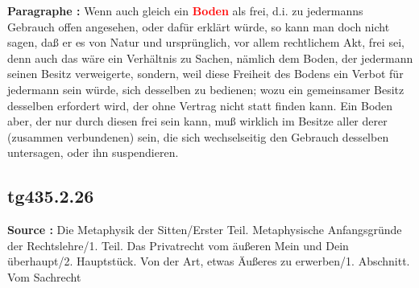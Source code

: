 \documentclass[a4paper,12pt,twoside]{book}
\newcommand{\match}[1]{\textcolor{red}{\textbf{#1}}}
\begin{document}
	\textbf{Paragraphe : }Wenn auch gleich ein \match{Boden} als frei, d.i. zu jedermanns Gebrauch offen angesehen, oder dafür erklärt würde, so kann man doch nicht sagen, daß er es von Natur und ursprünglich, vor allem rechtlichem Akt, frei sei, denn auch das wäre ein Verhältnis zu Sachen, nämlich dem Boden, der jedermann seinen Besitz verweigerte, sondern, weil diese Freiheit des Bodens ein Verbot für jedermann sein würde, sich desselben zu bedienen; wozu ein gemeinsamer Besitz desselben erfordert wird, der ohne Vertrag nicht statt finden kann. Ein Boden aber, der nur durch diesen frei sein kann, muß wirklich im Besitze aller derer (zusammen verbundenen) sein, die sich wechselseitig den Gebrauch desselben untersagen, oder ihn suspendieren. 
	
	\subsection*{tg435.2.26} 
	\textbf{Source : }Die Metaphysik der Sitten/Erster Teil. Metaphysische Anfangsgründe der Rechtslehre/1. Teil. Das Privatrecht vom äußeren Mein und Dein überhaupt/2. Hauptstück. Von der Art, etwas Äußeres zu erwerben/1. Abschnitt. Vom Sachrecht\\  
	
\end{document}
